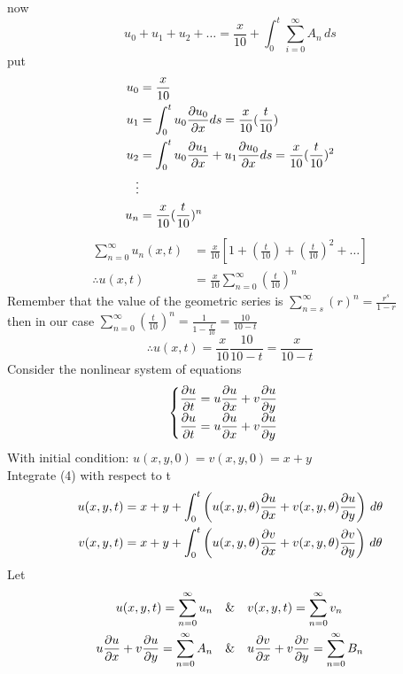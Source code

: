 \documentclass[]{article}
\begin{document}
now 
\[
u_0 + u_1 + u_2+\dots = \frac{x}{10} + \int_{0}^{t} \sum_{i=0}^{\infty} A_n  \,ds
\]
put 
\begin{align*}
    u_0 &=  \frac{x}{10}
    \\
    u_1 &= \int_{0}^{t} u_0 \pdv{u_0}{x}ds =\frac{x}{10} (\frac{t}{10})
    \\
    u_2 &= \int_{0}^{t}u_0 \pdv{u_1}{x} + u_1 \pdv{u_0}{x}ds = \frac{x}{10} (\frac{t}{10})^2
    \\
    \vdots
    \\
    u_n &= \frac{x}{10} (\frac{t}{10})^n
\end{align*}
\begin{align*}
    \sum_{n=0}^{\infty} u_n(x,t) &= \frac{x}{10}\left[1 +\left(\frac{t}{10}\right) +\left(\frac{t}{10}\right)^2 +\dots \right]
    \\
    \therefore u(x,t) &= \frac{x}{10}\sum_{n=0}^{\infty} \left(\frac{t}{10}\right)^n
\end{align*}
Remember that the value of the geometric series is $\displaystyle \sum_{n=s}^{\infty} \left(r\right)^n  = \frac{r^s}{1-r}  $
\\
then in our case $\displaystyle \sum_{n=0}^{\infty} \left(\frac{t}{10}\right)^n = \frac{1}{1-\frac{t}{10}} = \frac{10}{10-t}$
\[
    \therefore u(x,t) = \frac{x}{10}\frac{10}{10-t} = \frac{x}{10-t}    
\]
Consider the nonlinear system of equations
\begin{equation}
    \begin{cases}
         \displaystyle \pdv{u}{t}= u\pdv{u}{x} + v\pdv{u}{y}
         \\
         \displaystyle \pdv{u}{t}= u\pdv{u}{x} + v\pdv{u}{y}
     \end{cases}
 \end{equation}
 With initial condition: $u(x,y,0)=v(x,y,0)=x+y$ \\
Integrate (4) with respect to t\\
\begin{align*} 
    u(x,y,t) &=x+y + \int_0^{t}\left( u(x,y,\theta)\pdv{u}{x} + v(x,y,\theta)\pdv{u}{y} \right)\, d\theta 
    \\
    v(x,y,t) &=x+y + \int_0^{t}\left(u(x,y,\theta)\pdv{v}{x} + v(x,y,\theta)\pdv{v}{y} \right) \, d\theta
\end{align*}
Let
\begin{align*}
    u(x,y,t) = \sum_{n=0}^{\infty} u_n \quad&\&\quad v(x,y,t) = \sum_{n=0}^\infty v_n
    \\
    u\pdv{u}{x}+v\pdv{u}{y} =\sum_{n=0}^\infty A_n \quad&\&\quad u\pdv{v}{x}+v\pdv{v}{y} =\sum_{n=0}^\infty B_n 
\end{align*}
\end{document}
